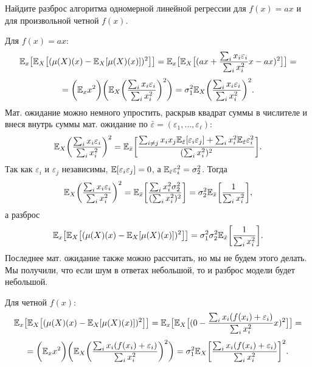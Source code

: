\documentclass[12pt,fleqn]{article}
\begin{document}
\begin{vkProblem}
    Найдите разброс алгоритма одномерной линейной регрессии для $f(x) = ax$ и для произвольной четной $f(x)$. 
\end{vkProblem}
\begin{esSolution}
    Для $f(x) = ax:$
    \[
    \mathbb{E}_{x}\bigl[\mathbb{E}_{X}\bigl[(\mu(X)(x) - \mathbb{E}_{X}[\mu(X)(x)] )^2\bigr]\bigr] = 
    \mathbb{E}_{x}\bigl[\mathbb{E}_{X}\bigl[(
    a x +  \frac{\sum_i x_i \varepsilon_i}{\sum_i x_i^2} x - ax
     )^2\bigr]\bigr] =
     \]
     \[ =\biggl( \mathbb{E}_{x} x^2 \biggr) 
     \biggl (\mathbb{E}_{X}\biggl(
     \frac{\sum_i x_i \varepsilon_i}{\sum_i x_i^2} 
    \biggr )^2\biggr) = \sigma_1^2
    \mathbb{E}_{X}
    \biggl (\frac{\sum_i x_i \varepsilon_i}{\sum_i x_i^2} \biggr)
    ^2.
    \]
    Мат. ожидание можно немного упростить, раскрыв квадрат суммы в числителе и внеся внутрь суммы мат. ожидание по $\bar \varepsilon = (\varepsilon_1, \dots, \varepsilon_\ell)$:
    \[
    \mathbb{E}_{X}\biggl(
    \frac{\sum_i x_i \varepsilon_i}{\sum_i x_i^2} 
    \biggr )^2 = \mathbb{E}_{\bar x} \biggl[ \frac {\sum_{i \ne j} x_i x_j \mathbb{E}_{\bar \varepsilon } [\varepsilon_i \varepsilon_j] +
        \sum_i x_i^2 \mathbb{E}_{\bar \varepsilon } \varepsilon_i^2 } {(\sum_i x_i^2)^2} 
     \biggr].
    \]
    Так как $\varepsilon_i$ и $\varepsilon_j$ независимы, $\mathbb{E}[\varepsilon_i \varepsilon_j] = 0$, а $\mathbb{E}_{\bar \varepsilon } \varepsilon_i^2 = \sigma_2^2$. Тогда
    \[
    \mathbb{E}_{X}\biggl(
    \frac{\sum_i x_i \varepsilon_i}{\sum_i x_i^2} 
    \biggr )^2 = \mathbb{E}_{\bar x} \biggl[ \frac {
        \sum_i x_i^2 \sigma_2^2} {(\sum_i x_i^2)^2} 
    \biggr] = \sigma_2^2 \mathbb{E}_{\bar x} \biggl[ \frac 1 {\sum_i x_i^2} \biggr],
    \]
    а разброс
    \[
    \mathbb{E}_{x}\bigl[\mathbb{E}_{X}\bigl[(\mu(X)(x) - \mathbb{E}_{X}[\mu(X)(x)] )^2\bigr]\bigr] = 
     \sigma_1^2 \sigma_2^2
    \mathbb{E}_{\bar x} \biggl[ \frac 1 {\sum_i x_i^2} \biggr].
    \]
    Последнее мат. ожидание также можно рассчитать, но мы не будем этого делать. Мы получили, что если шум в ответах небольшой, то и разброс модели будет небольшой. 
    
    Для четной $f(x)$:
    \[
    \mathbb{E}_{x}\bigl[\mathbb{E}_{X}\bigl[(\mu(X)(x) - \mathbb{E}_{X}[\mu(X)(x)] )^2\bigr]\bigr] = 
    \mathbb{E}_{x}\bigl[\mathbb{E}_{X}\bigl[( 0 -
    \frac{\sum_i x_i (f(x_i)+\varepsilon_i)}{\sum_i x_i^2} x
    )^2\bigr]\bigr] =
    \]
    \[ =\biggl( \mathbb{E}_{x} x^2 \biggr) 
    \biggl (\mathbb{E}_{X}\biggl(
    \frac{\sum_i x_i (f(x_i)+\varepsilon_i)}{\sum_i x_i^2}
    \biggr )^2\biggr) = \sigma_1^2
    \mathbb{E}_{X}\biggl[
    \frac{\sum_i x_i (f(x_i)+\varepsilon_i)}{\sum_i x_i^2}
    \biggr ]^2.
    \]
\end{esSolution}
\end{document}
